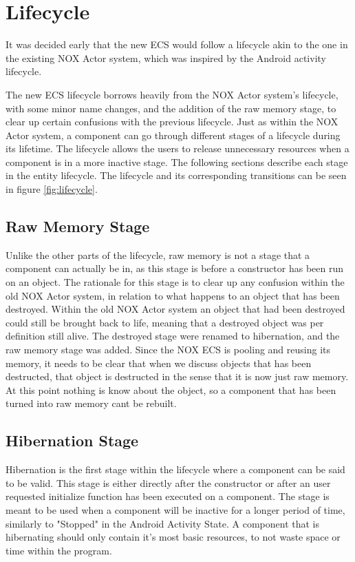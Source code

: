 \section{Lifecycle}
\label{subsec:high_level_lifecycle}
It was decided early that the new ECS would follow a lifecycle akin to the one in the existing NOX Actor system,
which was inspired by the Android activity lifecycle\cite{android_activity_lifecycle}.

The new ECS lifecycle borrows heavily from the NOX Actor system's lifecycle, with some minor name changes,
and the addition of the raw memory stage, to clear up certain confusions with the previous lifecycle.
Just as within the NOX Actor system, a component can go through different stages of a lifecycle during its lifetime.
The lifecycle allows the users to release unnecessary resources when a component is in a more inactive stage.
The following sections describe each stage in the entity lifecycle.
The lifecycle and its corresponding transitions can be seen in figure \ref{fig:lifecycle}.

\subsection{Raw Memory Stage}
Unlike the other parts of the lifecycle, raw memory is not a stage that a component can actually be in,
as this stage is before a constructor has been run on an object.
The rationale for this stage is to clear up any confusion within the old NOX Actor system,
in relation to what happens to an object that has been destroyed.
Within the old NOX Actor system an object that had been destroyed could still be brought back to life,
meaning that a destroyed object was per definition still alive.
The destroyed stage were renamed to hibernation, and the raw memory stage was added.
Since the NOX ECS is pooling and reusing its memory, it needs to be clear that when we discuss objects
that has been destructed, that object is destructed in the sense that it is now just raw memory.
At this point nothing is know about the object, so a component that has been turned into raw memory cant be rebuilt.

\subsection{Hibernation Stage}
Hibernation is the first stage within the lifecycle where a component can be said to be valid.
This stage is either directly after the constructor or after an user requested initialize function has been executed on a component.
The stage is meant to be used when a component will be inactive for a longer period of time, similarly to "Stopped" in the Android Activity State\cite[Activity state and ejection from memory]{android_activity_lifecycle}.
A component that is hibernating should only contain it's most basic resources, to not waste space or time within the program.

